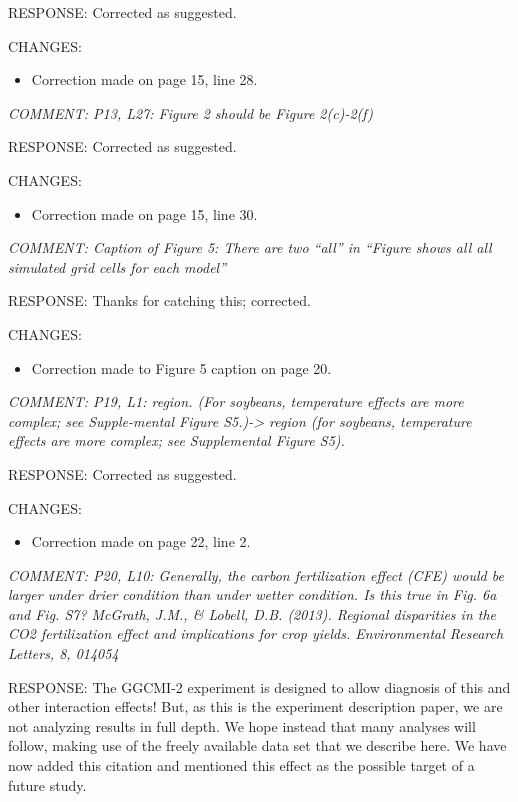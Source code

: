 \documentclass[gmd, manuscript]{copernicus} %
\begin{document}
RESPONSE: Corrected as suggested.
\smallskip

CHANGES:
\begin{itemize}
    \item Correction made on page 15, line 28.
\end{itemize}

\smallskip

\textcolor{dark-gray}{\textit{COMMENT: P13, L27: Figure 2 should be Figure 2(c)-2(f)}}

RESPONSE: Corrected as suggested.
\smallskip

CHANGES:
\begin{itemize}
    \item Correction made on page 15, line 30.
\end{itemize}

\smallskip

\textcolor{dark-gray}{\textit{COMMENT: Caption of Figure 5: There are two “all” in “Figure shows all all simulated grid cells for each model”}}

RESPONSE: Thanks for catching this; corrected.
\smallskip

CHANGES:
\begin{itemize}
    \item Correction made to Figure 5 caption on page 20.
\end{itemize}

\smallskip

\textcolor{dark-gray}{\textit{COMMENT: P19, L1: region. (For soybeans, temperature effects are more complex; see Supple-mental Figure S5.)-> region (for soybeans, temperature effects are more complex; see Supplemental Figure S5).}}

RESPONSE: Corrected as suggested.
\smallskip

CHANGES:
\begin{itemize}
    \item Correction made on page 22, line 2.
\end{itemize}

\smallskip

\textcolor{dark-gray}{\textit{COMMENT: P20, L10: Generally, the carbon fertilization effect (CFE) would be larger under drier condition than under wetter condition. Is this true in Fig. 6a and Fig. S7? McGrath, J.M., \& Lobell, D.B. (2013). Regional disparities in the CO2 fertilization effect and implications for crop yields. Environmental Research Letters, 8, 014054}}

RESPONSE: The GGCMI-2 experiment is designed to allow diagnosis of this and other interaction effects! But, as this is the experiment description paper, we are not analyzing results in full depth. We hope instead that many analyses will follow, making use of the freely available data set that we describe here. We have now added this citation and mentioned this effect as the possible target of a future study.
\smallskip
\end{document}
